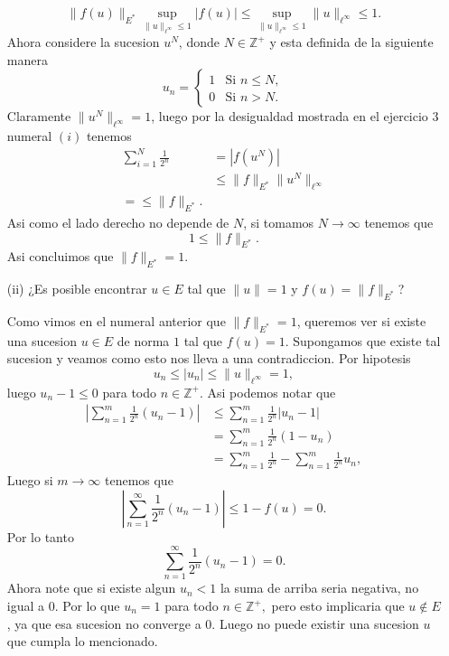 \begin{enumerate}
\begin{sols}
    $$\|f(u)\|_{E^*}\sup_{\|u\|_{\ell^\infty}\leq 1}|f(u)|\leq\sup_{\|u\|_{\ell^\infty}\leq 1}\|u\|_{\ell^\infty}\leq 1.$$
    Ahora considere la sucesion $u^N$, donde $N\in \mathbb{Z}^+$ y esta definida de la siguiente manera
    $$u_n=\begin{cases}
        1 & \text{Si }n\leq N,\\
        0 & \text{Si }n>N.
    \end{cases}$$
    Claramente $\|u^N\|_{\ell^\infty}=1$, luego por la desigualdad mostrada en el ejercicio $3$ numeral $(i)$ tenemos
    \begin{align*}
        \sum_{i=1}^N\frac{1}{2^n}&=|f(u^N)|\\
        &\leq\|f\|_{E^*}\|u^N\|_{\ell^\infty}\\
        =\leq\|f\|_{E^*}
    .\end{align*}
    Asi como el lado derecho no depende de $N$, si tomamos $N\to \infty$ tenemos que 
    $$1\leq\|f\|_{E^*}.$$
    Asi concluimos que $\|f\|_{E^*}=1.$
    
    \end{sols}
    \item[(ii)] ¿Es posible encontrar $u \in E$ tal que $\|u\| = 1$ y $f(u) = \|f\|_{E^*}$?
    \begin{sols}
        Como vimos en el numeral anterior que $\|f\|_{E^*}=1$, queremos ver si existe una sucesion $u\in E$ de norma $1$ tal que $f(u)=1.$ Supongamos que existe tal sucesion y veamos como esto nos lleva a una contradiccion. Por hipotesis
        $$u_n\leq |u_n|\leq \|u\|_{\ell^\infty}=1,$$
        luego $u_n-1\leq 0$ para todo $n\in \mathbb{Z}^+.$ Asi podemos notar que
        \begin{align*}
        \left|\sum_{n=1}^m\frac{1}{2^n}(u_n-1)\right|&\leq \sum_{n=1}^m\frac{1}{2^n}|u_n-1|\\
        &=\sum_{n=1}^m\frac{1}{2^n}(1-u_n)\\
        &=\sum_{n=1}^m\frac{1}{2^n}-\sum_{n=1}^m\frac{1}{2^n}u_n,
        \end{align*}
        Luego si $m\to \infty$ tenemos que 
        $$\left|\sum_{n=1}^\infty\frac{1}{2^n}(u_n-1)\right|\leq 1-f(u)=0.$$
        Por lo tanto  
        $$\sum_{n=1}^\infty\frac{1}{2^n}(u_n-1)=0.$$
        Ahora note que si existe algun $u_n<1$ la suma de arriba seria negativa, no igual a 0. Por lo que $u_n=1$ para todo $n\in \mathbb{Z}^+,$ pero esto implicaria que $u\notin E$, ya que esa sucesion no converge a 0. Luego no puede existir una sucesion $u$ que cumpla lo mencionado.

    \end{sols}
\end{enumerate}




